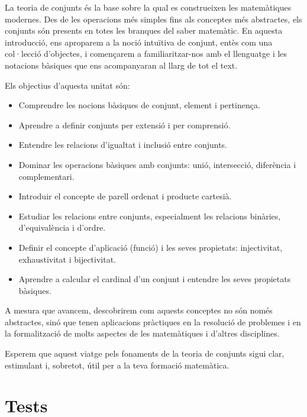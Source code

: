 \documentclass[12pt,a4paper,oneside]{book}
\begin{document}
La teoria de conjunts és la base sobre la qual es construeixen les matemàtiques modernes. Des de les operacions més simples fins als conceptes més abstractes, els conjunts són presents en totes les branques del saber matemàtic. En aquesta introducció, ens aproparem a la noció intuïtiva de conjunt, entès com una col·lecció d’objectes, i començarem a familiaritzar-nos amb el llenguatge i les notacions bàsiques que ens acompanyaran al llarg de tot el text.

\bigskip

Els objectius d’aquesta unitat són:

\begin{itemize}
\item Comprendre les nocions bàsiques de conjunt, element i pertinença.

\item Aprendre a definir conjunts per extensió i per comprensió.

\item Entendre les relacions d’igualtat i inclusió entre conjunts.

\item Dominar les operacions bàsiques amb conjunts: unió, intersecció, diferència i complementari.

\item Introduir el concepte de parell ordenat i producte cartesià.

\item Estudiar les relacions entre conjunts, especialment les relacions binàries, d’equivalència i d’ordre.

\item Definir el concepte d’aplicació (funció) i les seves propietats: injectivitat, exhaustivitat i bijectivitat.

\item Aprendre a calcular el cardinal d’un conjunt i entendre les seves propietats bàsiques.
\end{itemize}

\bigskip
A mesura que avancem, descobrirem com aquests conceptes no són només abstractes, sinó que tenen aplicacions pràctiques en la resolució de problemes i en la formalització de molts aspectes de les matemàtiques i d’altres disciplines.

\bigskip

Esperem que aquest viatge pels fonaments de la teoria de conjunts sigui clar, estimulant i, sobretot, útil per a la teva formació matemàtica.

\let\cleardoublepage\clearpage

\mainmatter





\chapter{Tests}
\label{cap:tests}

\begin{Form}



\end{Form}

\backmatter
\end{document}
